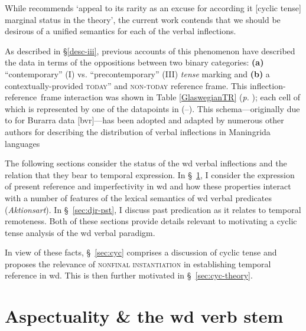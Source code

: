 While \citet[89]{Comrie1985} recommends `appeal to its rarity as an excuse for according it [cyclic tense] marginal status in the theory', the current work contends that we should be desirous of a unified semantics for each of the verbal inflections.


As described in \S \ref{desc-iii}, previous accounts of this phenomenon have described the data in terms of the oppositions between two binary categories: \textbf{(a)} ``contemporary'' (\gls{I}) vs. ``precontemporary'' (\gls{III}) \textit{tense} marking and \textbf{(b)} a contextually-provided \textsc{today}'' and \textsc{non-today} reference frame. This inflection-reference~frame interaction was shown in Table  \ref{GlaswegianTR} (\textit{p.} \pageref{GlaswegianTR}); each cell of which is represented by one of the datapoints in (--). This schema---originally due to  \citet{Glasgow1964} for Burarra data [\gls{bvr}]---has been adopted and adapted by numerous other authors for describing the distribution of verbal inflections in Maningrida languages \citetext{see \citealp{Eather2011,Green1987,Green1995} for Nakkara [\gls{nck}], Burarra [\gls{bvr}] and Gurrgoni [\gls{gge}] respectively.}




The following sections consider the status of the \gls{wd} verbal inflections and the relation that they bear to temporal expression. In \S~\ref{sec:djr-prs}, I consider the expression of present reference and imperfectivity in \gls{wd} and how these properties interact with a number of features of the lexical semantics of \gls{wd} verbal predicates (\textit{Aktionsart}). In \S~\ref{sec:djr-pst}, I discuss past predication as it relates to temporal remoteness. Both of these sections provide details relevant to motivating a cyclic tense analysis of the \gls{wd} verbal paradigm.

In view of these facts, \S~\ref{sec:cyc} comprises a discussion of cyclic tense and proposes the relevance of \textsc{nonfinal instantiation} in establishing temporal reference in \gls{wd}. This is then further motivated in \S~\ref{sec:cyc-theory}.



\section{Aspectuality \& the \gls{wd} verb stem}%
\label{sec:djr-prs}





